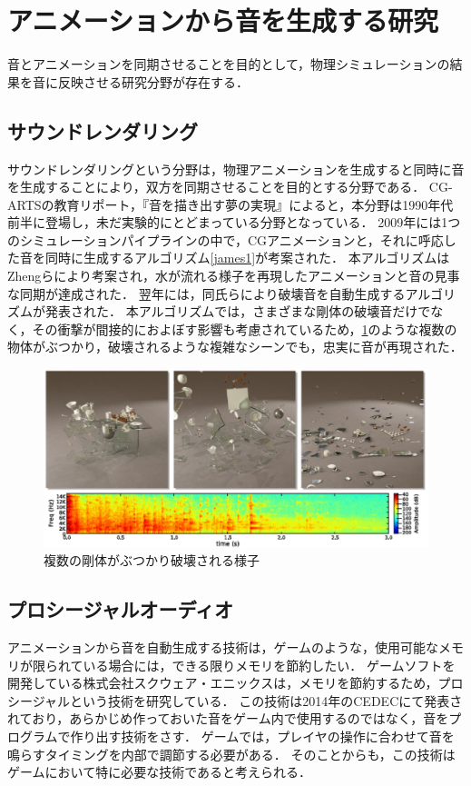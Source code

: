 \section{アニメーションから音を生成する研究}\label{sec:generate_sound}
音とアニメーションを同期させることを目的として，物理シミュレーションの結果を音に反映させる研究分野が存在する．\\
%
\subsection{サウンドレンダリング}
サウンドレンダリングという分野は，物理アニメーションを生成すると同時に音を生成することにより，双方を同期させることを目的とする分野である．
CG-ARTSの教育リポート，『音を描き出す夢の実現』\cite{CG-ARTS}によると，本分野は1990年代前半に登場し，未だ実験的にとどまっている分野となっている．
2009年には1つのシミュレーションパイプラインの中で，CGアニメーションと，それに呼応した音を同時に生成するアルゴリズム\ref{james1}が考案された．
本アルゴリズムはZhengらにより考案され，水が流れる様子を再現したアニメーションと音の見事な同期が達成された．
%
翌年には，同氏らにより破壊音を自動生成するアルゴリズム\cite{james2}が発表された．
本アルゴリズムでは，さまざまな剛体の破壊音だけでなく，その衝撃が間接的におよぼす影響も考慮されているため，\ref{fig:james2}のような複数の物体がぶつかり，破壊されるような複雑なシーンでも，忠実に音が再現された．
\begin{figure}[h]
	\centering
	\includegraphics[width=14cm]{fig/chap2/james2.eps}
	\caption{複数の剛体がぶつかり破壊される様子}
	\label{fig:james2}
\end{figure}

\subsection{プロシージャルオーディオ}
アニメーションから音を自動生成する技術は，ゲームのような，使用可能なメモリが限られている場合には，できる限りメモリを節約したい．
ゲームソフトを開発している株式会社スクウェア・エニックスは，メモリを節約するため，プロシージャルという技術を研究している．
この技術は2014年のCEDEC\cite{SQUARE}にて発表されており，あらかじめ作っておいた音をゲーム内で使用するのではなく，音をプログラムで作り出す技術をさす．
ゲームでは，プレイヤの操作に合わせて音を鳴らすタイミングを内部で調節する必要がある．
そのことからも，この技術はゲームにおいて特に必要な技術であると考えられる．

